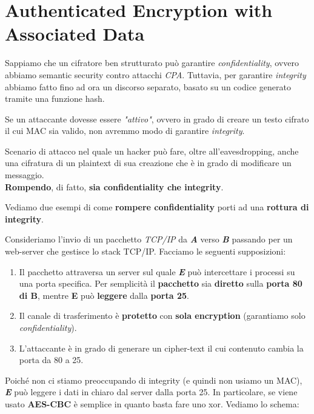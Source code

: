 \chapter{Authenticated Encryption with Associated Data}\label{chap:aead}
Sappiamo che un cifratore ben strutturato può garantire \textit{confidentiality}, ovvero abbiamo semantic security contro attacchi \textit{CPA}. Tuttavia, per garantire \textit{integrity} abbiamo fatto fino ad ora un discorso separato, basato su un codice generato tramite una funzione hash.
\begin{remark}
Se un attaccante dovesse essere \textit{"attivo"}, ovvero in grado di creare un testo cifrato il cui MAC sia valido, non avremmo modo di garantire \textit{integrity}.
\end{remark}
\begin{definition}\label{def:cca}
Scenario di attacco nel quale un hacker può fare, oltre all'eavesdropping, anche una cifratura di un plaintext di sua creazione che è in grado di modificare un messaggio.\\
\textbf{Rompendo}, di fatto, \textbf{sia confidentiality che integrity}.
\end{definition}
Vediamo due esempi di come \textbf{rompere confidentiality} porti ad una \textbf{rottura di integrity}.
\begin{example}Consideriamo l'invio di un pacchetto \textit{TCP/IP} da \textit{\textbf{A}} verso \textit{\textbf{B}} passando per un web-server che gestisce lo stack TCP/IP. Facciamo le seguenti supposizioni: 
\begin{enumerate}
    \item Il pacchetto attraversa un server sul quale \textit{\textbf{E}} può intercettare i processi su una porta specifica. Per semplicità il \textbf{pacchetto} sia \textbf{diretto} sulla \textbf{porta 80 di B}, mentre \textbf{E} può \textbf{leggere} dalla \textbf{porta 25}. 
    \item Il canale di trasferimento è \textbf{protetto} con \textbf{sola encryption} (garantiamo solo \textit{confidentiality}).
    \item L'attaccante è in grado di generare un cipher-text il cui contenuto cambia la porta da 80 a 25. 
\end{enumerate}
Poiché non ci stiamo preoccupando di integrity (e quindi non usiamo un MAC), \textit{\textbf{E}} può leggere i dati in chiaro dal server dalla porta 25. In particolare, se viene usato \textbf{AES-CBC} è semplice in quanto basta fare uno xor. Vediamo lo schema:
\end{example}
